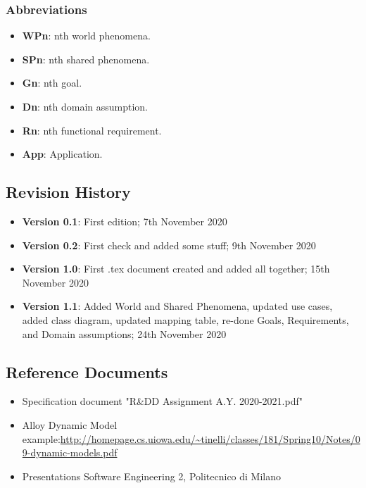 \subsubsection{Abbreviations}
\begin{itemize}
	\item \textbf{WPn}: nth world phenomena.
	\item \textbf{SPn}: nth shared phenomena.
	\item \textbf{Gn}: nth goal.
	\item \textbf{Dn}: nth domain assumption.
	\item \textbf{Rn}: nth functional requirement.
	\item \textbf{App}: Application.
\end{itemize}

\newpage
\subsection{Revision History}
\begin{itemize}
	\item \textbf{Version 0.1}: First edition; 7th November 2020
	\item \textbf{Version 0.2}: First check and added some stuff; 9th November 2020
	\item \textbf{Version 1.0}: First .tex document created and added all together; 15th November 2020
	\item \textbf{Version 1.1}: Added World and Shared Phenomena, updated use cases, added class diagram, updated mapping table, re-done Goals, Requirements, and Domain assumptions; 24th November 2020
\end{itemize}

\newpage
\subsection{Reference Documents}
\begin{itemize}
	\item Specification document "R\&DD Assignment A.Y. 2020-2021.pdf"
	\item Alloy Dynamic Model example:\url{http://homepage.cs.uiowa.edu/~tinelli/classes/181/Spring10/Notes/09-dynamic-models.pdf}
	\item Presentations Software Engineering 2, Politecnico di Milano
\end{itemize}

\newpage
